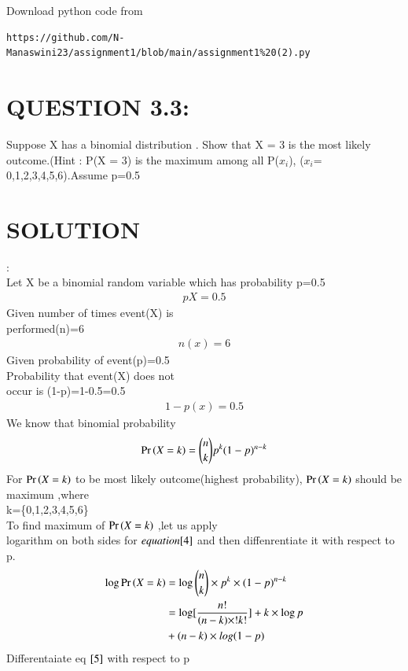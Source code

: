 \documentclass[journal,12pt,twocolumn]{IEEEtran}
\begin{document}
\renewcommand{\thefigure}{\theenumi}
\renewcommand{\thetable}{\theenumi}
Download python code from 
\begin{lstlisting}
https://github.com/N-Manaswini23/assignment1/blob/main/assignment1%20(2).py
\end{lstlisting}
%



\section*{ QUESTION 3.3:}
Suppose X has a binomial
 distribution . Show that X = 3 is the most likely outcome.(Hint : P(X = 3) is the maximum among all P($x_i$), ($x_i$= 0,1,2,3,4,5,6).Assume p=0.5 
 \\
\section*{SOLUTION}:\\
Let X be a binomial random variable which has probability p=0.5\\
 \begin{align}
p{X}=0.5 \label{1}
 \end{align}
Given number of times event(X) is\\
 performed(n)=6\\
 \begin{align}
 n(x)=6 \label{2}
 \end{align}
Given probability of event(p)=0.5\\
Probability that event(X) does not \\occur is
(1-p)=1-0.5=0.5\\
 \begin{align}
1-p(x)=0.5 \label{3}
 \end{align}
We know that binomial probability\\
\begin{align}
\Pr\left(X=k\right)= \binom{n}{k}p^k({1-p})^{n-k}  \label{4} 
\end{align}
For $\Pr\left(X=k\right)$ to be most likely outcome(highest probability),
 $\Pr\left(X=k\right)$  should be maximum ,where\\
 k=\{0,1,2,3,4,5,6\}\\
To find maximum of  $\Pr\left(X=k\right)$  ,let us  apply \\logarithm on both sides for $equation\eqref{4}$ and then diffenrentiate it with respect
to p.
\begin{align}
\log  \Pr\left(X=k\right) &=\log \binom{n}{k}\times p^k\times ({1-p})^{n-k} \\
&=\log[\frac{n!}{(n-k)\times !k!}]+k \times \log p \notag \\
 &+(n-k)\times log (1-p) \label{5}
\end{align}
Differentaiate eq $\eqref{5}$ with respect to p
\end{document}
